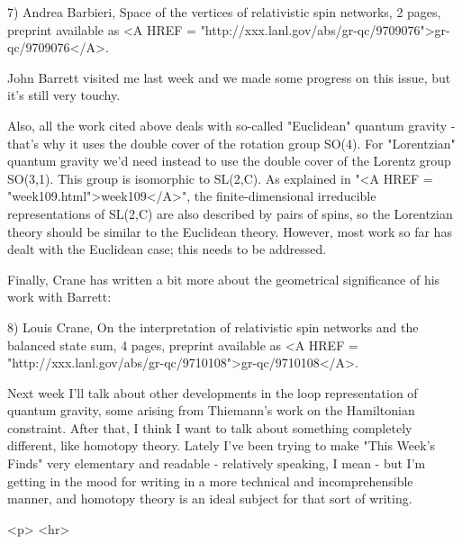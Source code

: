 7) Andrea Barbieri, Space of the vertices of relativistic spin networks,
2 pages, preprint available as <A HREF = "http://xxx.lanl.gov/abs/gr-qc/9709076">gr-qc/9709076</A>.  

John Barrett visited me last week and we made some progress on this
issue, but it's still very touchy.

Also, all the work cited above deals with so-called "Euclidean" quantum
gravity - that's why it uses the double cover of the rotation group
SO(4).  For "Lorentzian" quantum gravity we'd need instead to use the
double cover of the Lorentz group SO(3,1).  This group is isomorphic to
SL(2,C).  As explained in "<A HREF = "week109.html">week109</A>", the finite-dimensional irreducible
representations of SL(2,C) are also described by pairs of spins, so the
Lorentzian theory should be similar to the Euclidean theory.  However,
most work so far has dealt with the Euclidean case; this needs to be
addressed.

Finally, Crane has written a bit more about the geometrical significance of
his work with Barrett:

8) Louis Crane, On the interpretation of relativistic spin networks and
the balanced state sum, 4 pages, preprint available as <A HREF = "http://xxx.lanl.gov/abs/gr-qc/9710108">gr-qc/9710108</A>.

Next week I'll talk about other developments in the loop representation
of quantum gravity, some arising from Thiemann's work on the Hamiltonian
constraint.  After that, I think I want to talk about something
completely different, like homotopy theory.  Lately I've been trying to 
make "This Week's Finds" very elementary and readable - relatively
speaking, I mean - but I'm getting in the mood for writing in a more
technical and incomprehensible manner, and homotopy theory is an ideal
subject for that sort of writing.




<p> <hr>



